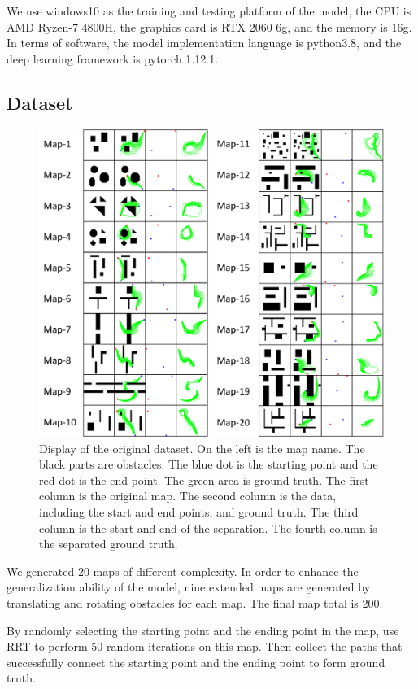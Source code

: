 \documentclass[smallcondensed]{svjour3}     %
\begin{document}
We use windows10 as the training and testing platform of the model, the CPU is AMD Ryzen-7 4800H, the graphics card is RTX 2060 6g, and the memory is 16g. 
In terms of software, the model implementation language is python3.8, and the deep learning framework is pytorch 1.12.1.

\subsection{Dataset}

\begin{figure}
\centering
\includegraphics[width=1\linewidth]{data-set-256.pdf}
\caption{Display of the original dataset.
On the left is the map name.
The black parts are obstacles.
The blue dot is the starting point and the red dot is the end point.
The green area is ground truth.
The first column is the original map.
The second column is the data, including the start and end points, and ground truth.
The third column is the start and end of the separation.
The fourth column is the separated ground truth.
}     
\label{fig: data-set}
\end{figure}

We generated 20 maps of different complexity.
In order to enhance the generalization ability of the model, nine extended maps are generated by translating and rotating obstacles for each map.
The final map total is 200.

By randomly selecting the starting point and the ending point in the map, use RRT to perform 50 random iterations on this map. 
Then collect the paths that successfully connect the starting point and the ending point to form ground truth.
\end{document}
